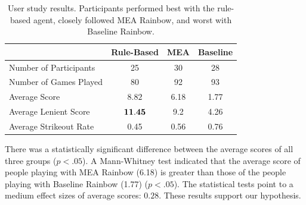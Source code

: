 \documentclass[letterpaper]{article} %
\begin{document}
\begin{table}[t]
\footnotesize
\centering
\begin{tabular}{ l c c c }
 \toprule
  & Rule-Based &  MEA & Baseline\\ 
 \midrule
 Number of Participants & 25 & 30 & 28 \\ 
 Number of Games Played & 80 & 92 & 93 \\
 Average Score & ${8.82}$ & 6.18 & 1.77 \\ [1ex] 
 Average Lenient Score & $\bf{11.45}$ & 9.2 & 4.26 \\ [1ex] 
 Average Strikeout Rate & 0.45 & 0.56 & 0.76 \\
 \bottomrule
\end{tabular}
    \caption{User study  results.
    Participants performed best with the rule-based agent, closely followed MEA Rainbow, and worst with Baseline Rainbow. }
\label{user_results}
\end{table}
There was a statistically significant difference between the average scores of all three groups %
($p < .05$). 
A Mann-Whitney test indicated that the average score of people playing with MEA Rainbow (6.18) is greater than those of the people playing with Baseline Rainbow (1.77) ($p < .05$).  
The statistical tests point to a medium effect sizes of average scores: $0.28$. 
These   
results 
support our hypothesis.
\end{document}
